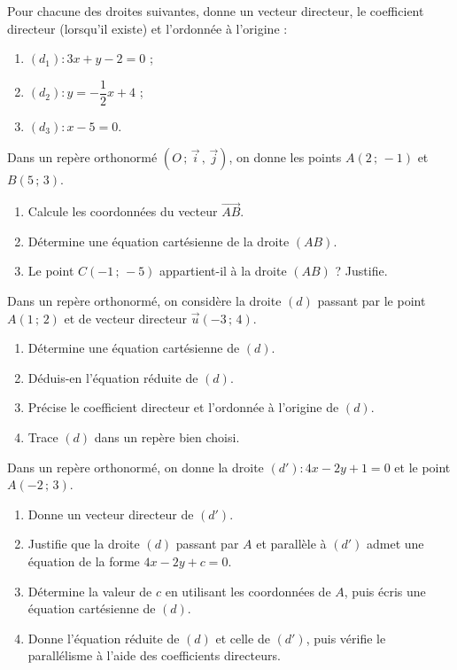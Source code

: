 \documentclass[11pt]{article}
\newcounter{popsec}
\newcounter{popsub}
\newcommand{\courssub}[1]{%
  \stepcounter{popsub}%
  \par\vspace{9pt}\noindent{\popxbold\fontsize{11.5}{13}\selectfont\color{popink}{\color{poporange}\thepopsec.\thepopsub}\hspace{6pt}#1}\par\nopagebreak\vspace{4pt}
}
\begin{document}
\begin{exercice}
Pour chacune des droites suivantes, donne un vecteur directeur, le coefficient directeur (lorsqu'il existe) et l'ordonnée à l'origine :
\begin{enumerate}
\item $(d_1) : 3x + y - 2 = 0$ ;
\item $(d_2) : y = -\dfrac{1}{2}x + 4$ ;
\item $(d_3) : x - 5 = 0$.
\end{enumerate}
\end{exercice}

\begin{exercice}
Dans un repère orthonormé $(O\,;\,\vec{i}\,,\,\vec{j})$, on donne les points $A(2\,;\,-1)$ et $B(5\,;\,3)$.
\begin{enumerate}
\item Calcule les coordonnées du vecteur $\overrightarrow{AB}$.
\item Détermine une équation cartésienne de la droite $(AB)$.
\item Le point $C(-1\,;\,-5)$ appartient-il à la droite $(AB)$ ? Justifie.
\end{enumerate}
\end{exercice}

\courssub{Je m'entraîne}

\begin{exercice}
Dans un repère orthonormé, on considère la droite $(d)$ passant par le point $A(1\,;\,2)$ et de vecteur directeur $\vec{u}(-3\,;\,4)$.
\begin{enumerate}
\item Détermine une équation cartésienne de $(d)$.
\item Déduis-en l'équation réduite de $(d)$.
\item Précise le coefficient directeur et l'ordonnée à l'origine de $(d)$.
\item Trace $(d)$ dans un repère bien choisi.
\end{enumerate}
\end{exercice}

\begin{exercice}
Dans un repère orthonormé, on donne la droite $(d') : 4x - 2y + 1 = 0$ et le point $A(-2\,;\,3)$.
\begin{enumerate}
\item Donne un vecteur directeur de $(d')$.
\item Justifie que la droite $(d)$ passant par $A$ et parallèle à $(d')$ admet une équation de la forme $4x - 2y + c = 0$.
\item Détermine la valeur de $c$ en utilisant les coordonnées de $A$, puis écris une équation cartésienne de $(d)$.
\item Donne l'équation réduite de $(d)$ et celle de $(d')$, puis vérifie le parallélisme à l'aide des coefficients directeurs.
\end{enumerate}
\end{exercice}
\end{document}
